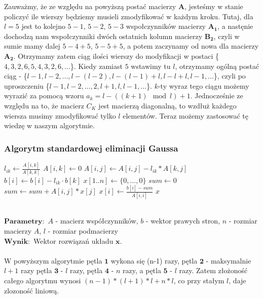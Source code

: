 \documentclass{article}
\begin{document}
Zauważmy, że ze względu na powyższą postać macierzy $\mathbf{A}$, jesteśmy w stanie policzyć ile wierszy będziemy musieli zmodyfikować w każdym kroku. Tutaj, dla $l=5$ jest to kolejno $5-1$, $5-2$, $5-3$ wspołczynników macierzy $\mathbf{A_{1}}$, a nastęnie dochodzą nam wspołczynniki dwóch ostatnich kolumn macierzy $\mathbf{B_{2}}$, czyli w sumie mamy dalej $5-4 + 5$, $5-5 + 5$, a potem zaczynamy od nowa dla macierzy $\mathbf{A_{2}}$. Otrzymamy zatem ciąg ilości wierszy do modyfikacji w postaci \{$4,3,2,6,5,4,3,2,6,...$\}. Kiedy zamiast $5$ wstawimy tu $l$, otrzymamy ogólną postać ciąg - \{$l-1,l-2, ...,l-(l-2), l-(l-1) + l, l - l + l, l - 1, ...$\}, czyli po uproszczeniu \{$l-1,l-2,...,2,l+1,l, l-1,...$\}. $k$-ty wyraz tego ciągu możemy wyrazić za pomocą wzoru $a_{k} = l - ((k+1) \mod{l}) + 1$. Jednocześnie ze względu na to, że macierz $C_{K}$ jest macierzą diagonalną, to wzdłuż każdego wiersza musimy zmodyfikować tylko $l$ elementów. Teraz możemy zastosować tę wiedzę w naszym algorytmie.
\newpage
\subsubsection{Algorytm standardowej eliminacji Gaussa}
\begin{algorithm}
    \begin{algorithmic}[1]
             
                 
                    \State $l_{ik} \gets \frac{A[i, k]}{A[k, k]}$
                    \State $A[i, k] \gets 0$
                     
                        \State $A[i, j] \gets A[i, j] - l_{ik}*A[k, j]$
                    \EndFor
                    \State $b[i] \gets b[i] - l_{ik} \cdot b[k]$
                \EndFor
            \EndFor
            \State $x[1..n] \gets \lbrace 0, \ldots, 0 \rbrace$
             
                \State $sum \gets 0$
                 
                    \State $sum \gets sum + A[i, j] * x[j]$
                \EndFor
                \State $x[i] \gets \frac{b[i] - sum}{A[i,i]}$
            \EndFor
            \State \Return $x$
        \EndFunction
    \end{algorithmic}
\end{algorithm} \\
$\mathbf{Parametry:}$ $A$ - macierz współczynników, $b$ - wektor prawych stron, $n$ - rozmiar macierzy $A$, $l$ - rozmiar podmacierzy\\
$\mathbf{Wynik:}$ Wektor rozwiązań układu $\mathbf{x}$.\\\\
W powyższym algorytmie pętla $\mathbf{1}$ wykona się (n-1) razy, pętla $\mathbf{2}$ - maksymalnie $l+1$ razy pętla $\mathbf{3}$ - $l$ razy, pętla $\mathbf{4}$ - $n$ razy, a pętla $\mathbf{5}$ - $l$ razy. Zatem złożoność całego algorytmu wynosi $(n-1)*(l+1)*l + n*l$, co przy stałym $l$, daje zlozoność liniową.
\newpage
\end{document}
